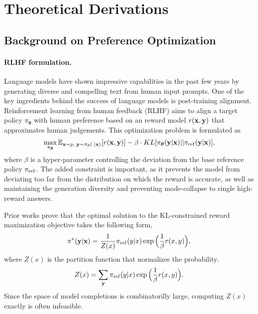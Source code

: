 

\newpage
\appendix
\onecolumn

\section{Theoretical Derivations}
\label{sec: theoretical derivations}

\subsection{Background on Preference Optimization}
\label{sec: background on rlhf}
\paragraph{RLHF formulation.}
Language models have shown impressive capabilities in the past few years by generating diverse and compelling text from human input prompts.
One of the key ingredients behind the success of language models is post-training alignment.
Reinforcement learning from human feedback (RLHF) aims to align a target policy $\pi_{\boldsymbol\theta}$ with human preference based on an reward model $r(\mathbf{x}, \mathbf{y})$ that approximates human judgements.
This optimization problem is formulated as 
\begin{equation*}
\max \limits_{\pi_{\boldsymbol\theta}}
\mathbb{E}_{{\mathbf{x} \sim p,\; \mathbf{y} \sim \pi_\theta(\cdot|\mathbf{x})}}
[r(\mathbf{x}, \mathbf{y})]
-
\beta \cdot KL[\pi_{\boldsymbol\theta}(\mathbf{y} | \mathbf{x}) || \pi_{\rm ref}(\mathbf{y} | \mathbf{x})],
\end{equation*}
where $\beta$ is a hyper-parameter controlling the deviation from the base reference policy $\pi_{\rm ref}$.
The added constraint is important,
as it prevents the model from deviating too far from the distribution on which the reward is accurate,
as well as maintaining the generation diversity and preventing mode-collapse to single high-reward answers.

Prior works \citep{go2023aligning, peters2007reinforcement} prove that the optimal solution to the KL-constrained reward maximization objective takes the following form,
\begin{equation*}
\pi^{\ast}(\mathbf{y} | \mathbf{x})
=
\frac{1} {Z(x)}
\pi_{\rm ref}(y | x) 
\exp 
\Big(
\frac{1} {\beta} r(x, y)
\Big),
\end{equation*}
where $Z(x)$ is the partition function that normalizes the probability.
\begin{equation*}
Z(x)
=
\sum_{\mathbf{y}}
\pi_{\rm ref}(y | x) 
\exp 
\Big(
\frac{1} {\beta} r(x, y)
\Big).
\end{equation*}
Since the space of model completions is combinatorilly large, computing $Z(x)$ exactly is often infeasible.

